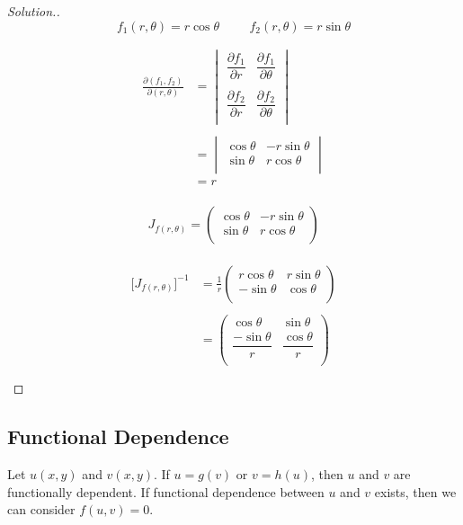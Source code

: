 \documentclass[11pt,a4paper]{article}
\theoremstyle{definition}
\newenvironment{solution}
  {\renewcommand{\qedsymbol}{}\begin{proof}[\textit{Solution}.]}
  {\end{proof}}
\begin{document}
\begin{solution}
$$f_1 (r,\theta) = r \cos \theta \hspace{1cm} f_2(r,\theta) = r \sin \theta$$

\begin{align*}
\frac{\partial (f_1,f_2)}{\partial(r,\theta)} & = \begin{vmatrix}
\dfrac{\partial f_1}{\partial r} & \dfrac{\partial f_1}{\partial \theta}\\\\
\dfrac{\partial f_2}{\partial r} & \dfrac{\partial f_2}{\partial \theta}\\
\end{vmatrix}\\\\
& = \begin{vmatrix}
\cos \theta & - r\sin \theta\\
\sin \theta & r\cos \theta \\
\end{vmatrix}\\
& = r\\
\end{align*}

$$ J_{f(r,\theta)} =  \begin{pmatrix}
\cos \theta & - r\sin \theta\\
\sin \theta & r\cos \theta \\
\end{pmatrix}$$\\

\begin{align*}
\big[J_{f(r,\theta)}\big]^{-1} & = \frac{1}{r}\begin{pmatrix}
r\cos \theta & r \sin \theta \\
-\sin \theta & \cos \theta\\
\end{pmatrix}\\\\
& = 
\begin{pmatrix}
\cos \theta & \sin \theta\\
\dfrac{-\sin \theta}{r} & \dfrac{\cos \theta}{r}\\
\end{pmatrix}\\\\
\end{align*}
\end{solution}

{\color[wave]{485}\subsection{Functional Dependence}}
Let $u(x,y)$ and $v(x,y)$. If $u = g(v)$ or $v = h(u)$, then $u$ and $v$ are functionally dependent. If functional dependence between $u$ and $v$ exists, then we can consider $f(u,v) = 0$.
\end{document}
